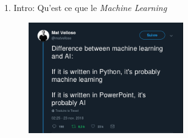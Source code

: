 \begin{frame}{1. Intro: Qu'est ce que le \textit{Machine Learning}}
  \begin{figure}
    \includegraphics[width=0.6\textwidth]{fig/mlvsAI.png}
  \end{figure}
\end{frame}

